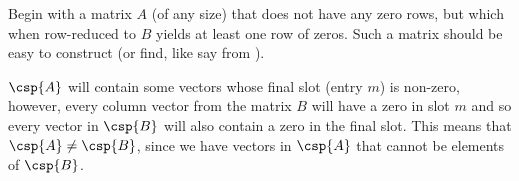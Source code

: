 Begin with a matrix $A$ (of any size) that does not have any zero rows, but which when row-reduced to $B$ yields at least one row of zeros.  Such a matrix should be easy to construct (or find, like say from ).\par
%
$\csp{A}$ will contain some vectors whose final slot (entry $m$) is non-zero, however, every column vector from the matrix $B$ will have a zero in slot $m$ and so every vector in $\csp{B}$ will also contain a zero in the final slot.  This means that $\csp{A}\neq\csp{B}$, since we have vectors in $\csp{A}$ that cannot be elements of $\csp{B}$.